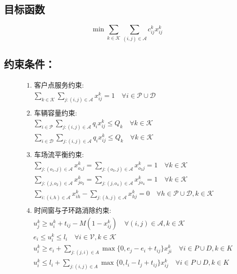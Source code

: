\documentclass[11pt]{ctexart}
\begin{document}
\subsection*{目标函数}
\[
\min \sum_{k \in \mathcal{K}} \sum_{(i,j) \in \mathcal{A}} c_{ij}^k x_{ij}^k
\]

\subsection*{约束条件：}
\begin{align*}
& \text{1. 客户点服务约束:} \\
& \quad \sum_{k \in \mathcal{K}} \sum_{j: (i,j) \in \mathcal{A}} x_{ij}^k = 1 \quad \forall i \in \mathcal{P} \cup \mathcal{D} \\
\\
& \text{2. 车辆容量约束:} \\
& \quad \sum_{i \in \mathcal{P}} \sum_{j: (i,j) \in \mathcal{A}} q_i x_{ij}^k \le Q_k \quad \forall k \in \mathcal{K} \\
& \quad \sum_{i \in \mathcal{D}} \sum_{j: (i,j) \in \mathcal{A}} q_i x_{ij}^k \le Q_k \quad \forall k \in \mathcal{K} \\
\\
& \text{3. 车场流平衡约束:} \\
& \quad \sum_{j: (o_1, j) \in \mathcal{A}} x_{o_1 j}^k = \sum_{j: (o_3, j) \in \mathcal{A}} x_{o_3 j}^k = 1 \quad \forall k \in \mathcal{K} \\
& \quad \sum_{j: (j, o_2) \in \mathcal{A}} x_{j o_2}^k = \sum_{j: (j, o_4) \in \mathcal{A}} x_{j o_4}^k = 1 \quad \forall k \in \mathcal{K} \\
& \quad \sum_{i: (i, h) \in \mathcal{A}} x_{i h}^k - \sum_{j: (h, j) \in \mathcal{A}} x_{h j}^k = 0 \quad \forall h \in \mathcal{P} \cup \mathcal{D}, k \in \mathcal{K} \\
\\
& \text{4. 时间窗与子环路消除约束:} \\
& \quad u_j^k \ge u_i^k + t_{ij} - M(1 - x_{ij}^k) \quad \forall (i, j) \in \mathcal{A}, k \in \mathcal{K} \\
& \quad e_i \le u_i^k \le l_i \quad \forall i \in \mathcal{V}, k \in \mathcal{K} \\
& \quad u_i^k \ge e_i + \sum_{j: (j,i) \in A} \max\{0, e_j - e_i + t_{ij}\} x_{ji}^k \quad \forall i \in P \cup D, k \in K \\
& \quad u_i^k \le l_i + \sum_{j: (i,j) \in A} \max\{0, l_i - l_j + t_{ij}\} x_{ij}^k \quad \forall i \in P \cup D, k \in K \\

\end{align*}
\end{document}
